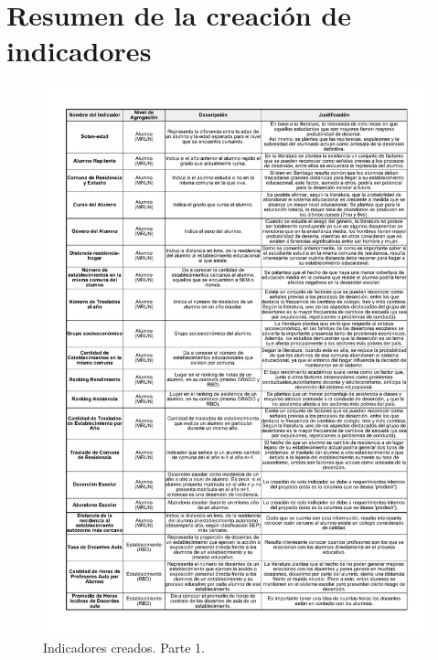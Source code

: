 \section{Resumen de la creación de indicadores}
\begin{figure}[H]
  \centering
    \includegraphics[width=1\textwidth]{Figuras/Indicadores1}
      \caption{Indicadores creados. Parte 1.}
    \label{fig:indicadores1}
\end{figure}
